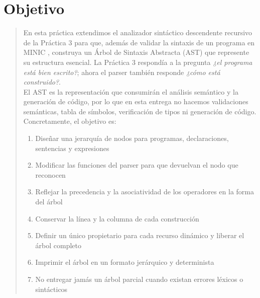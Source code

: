 \documentclass[12pt,letterpaper]{article}
\newcommand{\minic}{
  {M\footnotesize INI\normalsize C}
}
\begin{document}
\thispagestyle{empty}


\newpage

\section*{Objetivo}

\begin{quote}
  En esta práctica extendimos el analizador sintáctico descendente recursivo de la Práctica 3 para que,
  además de validar la sintaxis de un programa en \minic, construya un Árbol de Sintaxis Abstracta (AST)
  que represente su estructura esencial. La Práctica 3 respondía a la pregunta \emph{¿el programa está bien
  escrito?}; ahora el parser también responde \emph{¿cómo está construido?}.\\

  El AST es la representación que consumirán el análisis semántico y la generación de código, por lo que en
  esta entrega no hacemos validaciones semánticas, tabla de símbolos, verificación de tipos ni generación de
  código. Concretamente, el objetivo es:

  \begin{enumerate}[label=\arabic*.]
  \item Diseñar una jerarquía de nodos para programas, declaraciones, sentencias y expresiones
  \item Modificar las funciones del parser para que devuelvan el nodo que reconocen
  \item Reflejar la precedencia y la asociatividad de los operadores en la forma del árbol
  \item Conservar la línea y la columna de cada construcción
  \item Definir un único propietario para cada recurso dinámico y liberar el árbol completo
  \item Imprimir el árbol en un formato jerárquico y determinista
  \item No entregar jamás un árbol parcial cuando existan errores léxicos o sintácticos
  \end{enumerate}
\end{quote}

\bigskip

\end{document}

